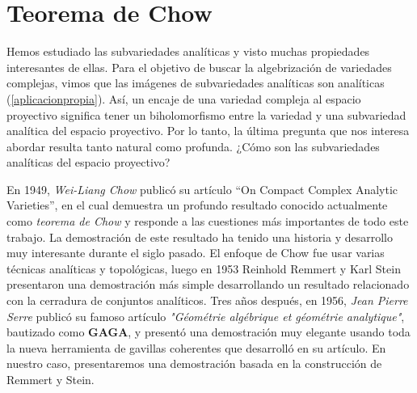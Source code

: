     \section{Teorema de Chow}
    
	Hemos estudiado las subvariedades analíticas y visto muchas propiedades interesantes de ellas. Para el objetivo de buscar la algebrización de variedades complejas, vimos que las imágenes de subvariedades analíticas son analíticas (\ref{aplicacionpropia}). Así, un encaje de una variedad compleja al espacio proyectivo significa tener un biholomorfismo entre la variedad y una subvariedad analítica del espacio proyectivo. Por lo tanto, la última pregunta que nos interesa abordar resulta tanto natural como profunda. ¿Cómo son las subvariedades analíticas del espacio proyectivo?
	
	En 1949, \textit{Wei-Liang Chow} publicó su artículo \enquote{On Compact Complex Analytic Varieties}, en el cual demuestra un profundo resultado conocido actualmente como \textit{teorema de Chow} y responde a las cuestiones más importantes de todo este trabajo. La demostración de este resultado ha tenido una historia y desarrollo muy interesante durante el siglo pasado. El enfoque de Chow fue usar varias técnicas analíticas y topológicas, luego en 1953 Reinhold Remmert y Karl Stein presentaron una demostración más simple desarrollando un resultado relacionado con la cerradura de conjuntos analíticos. Tres años después, en 1956, \textit{Jean Pierre Serre} publicó su famoso artículo \textit{"Géométrie algébrique et géométrie analytique"}, bautizado como \textbf{GAGA}, y presentó una demostración muy elegante usando toda la nueva herramienta de gavillas coherentes que desarrolló en su artículo. En nuestro caso, presentaremos una demostración basada en la construcción de Remmert y Stein.

